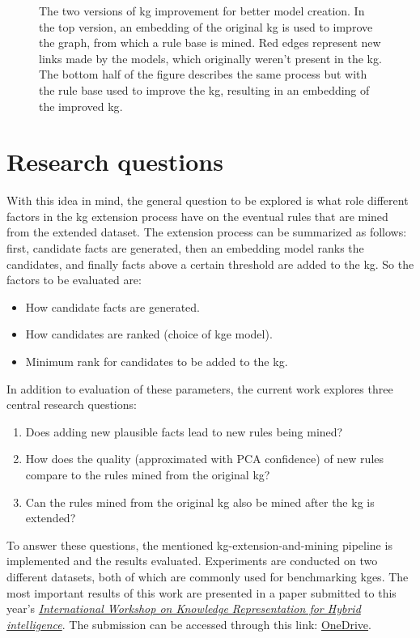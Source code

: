 \begin{figure}[H]
    \centering
    
    \caption[Figure representing the process.]{The two versions of \gls{kg} improvement for better model creation. In the top version, an embedding of the original \gls{kg} is used to improve the graph, from which a rule base is mined. Red edges represent new links made by the models, which originally weren't present in the \gls{kg}. The bottom half of the figure describes the same process but with the rule base used to improve the \gls{kg}, resulting in an embedding of the improved \gls{kg}.}
    \label{rule_based_and_embedding}
\end{figure}

\section{Research questions}
With this idea in mind, the general question to be explored is what role different factors in the \gls{kg} extension process have on the eventual rules that are mined from the extended dataset. The extension process can be summarized as follows: first, candidate facts are generated, then an embedding model ranks the candidates, and finally facts above a certain threshold are added to the \gls{kg}. So the factors to be evaluated are:
\begin{itemize}
    \item How candidate facts are generated.
    \item How candidates are ranked (choice of \gls{kge} model).
    \item Minimum rank for candidates to be added to the \gls{kg}.
\end{itemize}

In addition to evaluation of these parameters, the current work explores three central research questions:
\begin{enumerate}
    \item Does adding new plausible facts lead to new rules being mined?
    \item How does the quality (approximated with PCA confidence) of new rules compare to the rules mined from the original \gls{kg}?
    \item Can the rules mined from the original \gls{kg} also be mined after the \gls{kg} is extended?
\end{enumerate}

To answer these questions, the mentioned \gls{kg}-extension-and-mining pipeline is implemented and the results evaluated. Experiments are conducted on two different datasets, both of which are commonly used for benchmarking \glspl{kge}. The most important results of this work are presented in a paper submitted to this year's \href{https://sites.google.com/view/kr4hi/home}{\textit{International Workshop on Knowledge Representation for Hybrid intelligence}}. The submission can be accessed through this link: \href{https://1drv.ms/b/s!AmqWMjPoErw-lIMSvmZOPIGrHn4l-g?e=MYpkuS}{OneDrive}.

